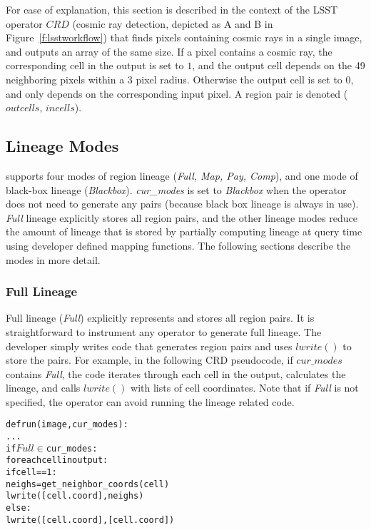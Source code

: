 For ease of explanation, this section is described in the context of
the LSST operator $CRD$ (cosmic ray detection, depicted as A and B in
Figure~\ref{f:lsstworkflow}) that finds pixels containing cosmic rays
in a single image, and outputs an array of the same size.  If a pixel
contains a cosmic ray, the corresponding cell in the output is set to
$1$, and the output cell depends on the 49 neighboring pixels within a
3 pixel radius.  Otherwise the output cell is set to $0$, and only
depends on the corresponding input pixel.  A region pair is denoted
($outcells$, $incells$).



\subsection{Lineage Modes}

\sys{} supports four modes of region lineage ({\it Full, Map, Pay, Comp}), and
one mode  of black-box lineage ({\it Blackbox}).  {\it cur\_modes} is set to
{\it Blackbox} when the operator does not need to generate any pairs (because
black box lineage is always in use).  {\it Full} lineage explicitly stores all
region pairs, and the other lineage modes reduce the amount of lineage that is
stored by partially computing lineage at query time using developer defined
mapping functions.  The following sections describe the modes in more detail.

\subsubsection{Full Lineage}

Full lineage ({\it Full}) explicitly represents and stores all region pairs.
It is straightforward to instrument any operator to generate full lineage.
The developer simply writes code that generates region pairs and uses
$lwrite()$ to store the pairs.  For example, in the following CRD pseudocode,
if $cur\_modes$ contains {\it Full}, the code iterates through each cell in the
output, calculates the  lineage, and calls $lwrite()$ with lists of cell
coordinates.  Note that if {\it Full} is not specified, the operator can avoid
running the lineage related code.

{\footnotesize
\begin{alltt}
  def run(image, cur_modes):
     ...
     if \(Full \in\) cur_modes:
       for each cell in output:
         if cell == 1:
           neighs = get_neighbor_coords(cell)
           lwrite([cell.coord], neighs)
        else:
           lwrite([cell.coord], [cell.coord])
\end{alltt}
}

